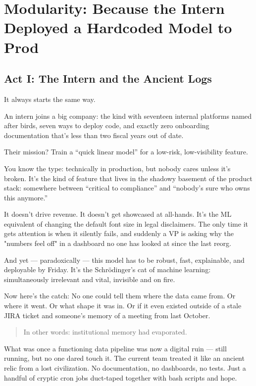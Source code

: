 \section{Modularity: Because the Intern Deployed a Hardcoded Model to Prod}

\subsection{Act I: The Intern and the Ancient Logs}

It always starts the same way.

An intern joins a big company: the kind with seventeen internal platforms named after birds, seven ways to deploy code, and exactly zero onboarding documentation that's less than two fiscal years out of date.

Their mission? Train a “quick linear model” for a low-risk, low-visibility feature.

You know the type: technically in production, but nobody cares unless it’s broken. It’s the kind of feature that lives in the shadowy basement of the product stack: somewhere between “critical to compliance” and “nobody’s sure who owns this anymore.” 

It doesn’t drive revenue. It doesn’t get showcased at all-hands. It’s the ML equivalent of changing the default font size in legal disclaimers. The only time it gets attention is when it silently fails, and suddenly a VP is asking why the "numbers feel off" in a dashboard no one has looked at since the last reorg.

And yet --- paradoxically --- this model has to be robust, fast, explainable, and deployable by Friday. It’s the Schrödinger’s cat of machine learning: simultaneously irrelevant and vital, invisible and on fire.


Now here's the catch: No one could tell them where the data came from.  Or where it went.  Or what shape it was in.  Or if it even existed outside of a stale JIRA ticket and someone’s memory of a meeting from last October.

\begin{quote}
In other words: institutional memory had evaporated.
\end{quote}

What was once a functioning data pipeline was now a digital ruin — still running, but no one dared touch it. The current team treated it like an ancient relic from a lost civilization. No documentation, no dashboards, no tests. Just a handful of cryptic cron jobs duct-taped together with bash scripts and hope.

